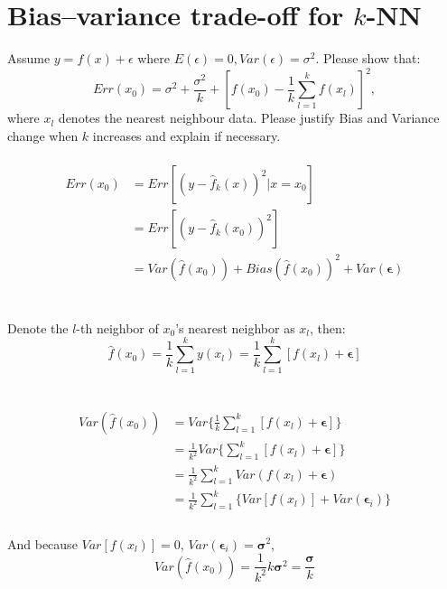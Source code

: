 \documentclass[11pt]{article}
\newcommand{\maximize}{\operatorname*{maximize}}
\newcommand{\mtx}[1]{\mathbf{#1}}
\def \mU {\mtx{U}}
\def \mS {\mtx{S}}
\def \mX {\mtx{X}}
\def \mepsilon {\mtx{\epsilon}}
\def \msigma {\mtx{\sigma}}
\begin{document}
\section*{Bias–variance trade-off for $k$-NN}
Assume $y=f(x)+\epsilon$ where $E(\epsilon)=0, Var(\epsilon)=\sigma^2$. Please show that:
\begin{equation}
	Err(x_0)=\sigma^2+\frac{\sigma^2}{k}+[f(x_0)-\frac{1}{k}\sum_{l=1}^{k}f(x_l)]^2,
\end{equation}
where $x_l$ denotes the nearest neighbour data.  Please justify Bias and Variance change when $k$ increases and explain if necessary.
\\ \\
\begin{equation}
\begin{aligned}
Err(x_0) &= Err[(y-\hat{f}_k(x))^2 | x=x_0]\\
&=Err[(y-\hat{f}_k(x_0))^2]\\
&=Var(\hat{f}(x_0))+Bias(\hat{f}(x_0))^2+Var(\mepsilon)
\end{aligned}
\end{equation}
\\ \\
Denote the $l$-th neighbor of $x_0$'s nearest neighbor as $x_l$, then:  
\begin{equation}
\hat{f}(x_0) =\frac{1}{k}\sum_{l=1}^{k}y(x_l) =\frac{1}{k}\sum_{l=1}^{k}[f(x_l)+\mepsilon]
\end{equation}
\\ \\
\begin{equation}
\begin{aligned}
Var(\hat{f}(x_0)) &= Var\{\frac{1}{k}\sum_{l=1}^{k}[f(x_l)+\mepsilon]\}\\
&= \frac{1}{k^2}Var\{\sum_{l=1}^{k}[f(x_l)+\mepsilon]\}\\
&= \frac{1}{k^2}\sum_{l=1}^{k}Var(f(x_l)+\mepsilon)\\
&= \frac{1}{k^2}\sum_{l=1}^{k}\{Var[f(x_l)]+Var(\mepsilon_i)\}\\
\end{aligned}
\end{equation}
\\
And because $Var[f(x_l)]=0$, $Var(\mepsilon_i)=\msigma^2$, \\
\begin{equation}
	Var(\hat{f}(x_0)) = \frac{1}{k^2}k\msigma^2=\frac{\msigma}{k}
\end{equation}
\\ \\
\end{document}
